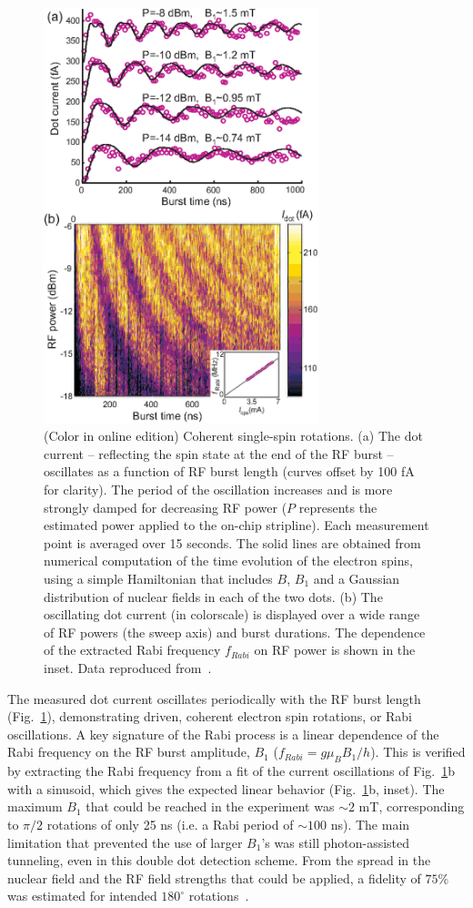 \documentclass[12pt,aps,nofootinbib]{revtex4-1}
\begin{document}
\begin{figure}[htb]
\includegraphics[width=8cm]{hanson_fig45.eps}
\caption{(Color in online edition) Coherent single-spin rotations. (a) The dot current --
reflecting the spin state at the end of the RF burst -- oscillates
as a function of RF burst length (curves offset by 100 fA for
clarity). The period of the oscillation increases and is more
strongly damped for decreasing RF power ($P$ represents the
estimated power applied to the on-chip stripline). Each
measurement point is averaged over 15 seconds. The solid lines are
obtained from numerical computation of the time evolution of the
electron spins, using a simple Hamiltonian that includes $B$,
$B_{1}$ and a Gaussian distribution of nuclear fields in each of
the two dots. (b) The oscillating dot current (in colorscale) is displayed over a wide
range of RF powers (the sweep axis) and burst durations. The
dependence of the extracted Rabi frequency $f_{Rabi}$ on RF power
is shown in the inset. Data reproduced from~\textcite{koppens06}.} 
\label{fig:ESR_Rabi}
\end{figure}

The measured dot current oscillates periodically with the RF burst
length (Fig.~\ref{fig:ESR_Rabi}), demonstrating driven, coherent
electron spin rotations, or Rabi oscillations. A key signature of
the Rabi process is a linear dependence of the Rabi frequency on
the RF burst amplitude, $B_1$ ($f_{Rabi}= g \mu_B B_1/h$). This is
verified by extracting the Rabi frequency from a fit of the
current oscillations of Fig.~\ref{fig:ESR_Rabi}b with a sinusoid,
which gives the expected linear behavior
(Fig.~\ref{fig:ESR_Rabi}b, inset). The maximum $B_1$ that could be
reached in the experiment was $\sim 2$ mT, corresponding to
$\pi/2$ rotations of only 25 ns (i.e. a Rabi period of $\sim 100$
ns). The main limitation that prevented the use of larger $B_1$'s
was still photon-assisted tunneling, even in this double dot
detection scheme. From the spread in the nuclear field and the RF field strengths that could be applied, a fidelity of $75\%$ was estimated for intended $180^\circ$ rotations~\cite{koppens06}.
\end{document}
